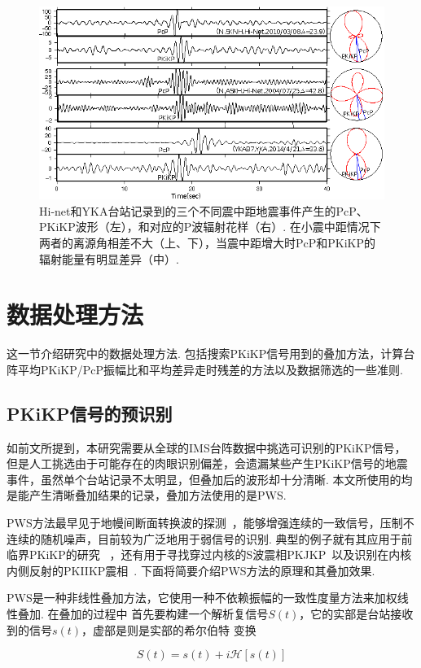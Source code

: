 \begin{figure}[ht]
\centering
\includegraphics[width=0.8\linewidth]{fig/chap2/rad}
\caption{Hi-net和YKA台站记录到的三个不同震中距地震事件产生的PcP、PKiKP波形（左），和对应的P波辐射花样（右）. 在小震中距情况下两者的离源角相差不大（上、下），当震中距增大时PcP和PKiKP的辐射能量有明显差异（中）. }
\label{fig:rad}
\end{figure}


\section{数据处理方法}

这一节介绍研究中的数据处理方法. 包括搜索PKiKP信号用到的叠加方法，计算台阵平均PKiKP/PcP振幅比和平均差异走时残差的方法以及数据筛选的一些准则. 

\subsection{PKiKP信号的预识别}

如前文所提到，本研究需要从全球的IMS台阵数据中挑选可识别的PKiKP信号，但是人工挑选由于可能存在的肉眼识别偏差，会遗漏某些产生PKiKP信号的地震事件，虽然单个台站记录不太明显，但叠加后的波形却十分清晰. 本文所使用的均是能产生清晰叠加结果的记录，叠加方法使用的是PWS. 

PWS方法最早见于地幔间断面转换波的探测~\citep{Schimmel1997}，能够增强连续的一致信号，压制不连续的随机噪声，目前较为广泛地用于弱信号的识别. 典型的例子就有其应用于前临界PKiKP的研究
~\citep{Koper2003,Koper2004}，还有用于寻找穿过内核的S波震相PKJKP~\citep{Deuss2000}以及识别在内核内侧反射的PKIIKP震相~\citep{Niu2008}. 下面将简要介绍PWS方法的原理和其叠加效果. 

PWS是一种非线性叠加方法，它使用一种不依赖振幅的一致性度量方法来加权线性叠加. 在叠加的过程中
首先要构建一个解析复信号$S(t)$，它的实部是台站接收到的信号$s(t)$，虚部是则是实部的希尔伯特
变换

\begin{equation}
S(t) = s(t) + i \mathscr{H} [s(t)]
\end{equation}

